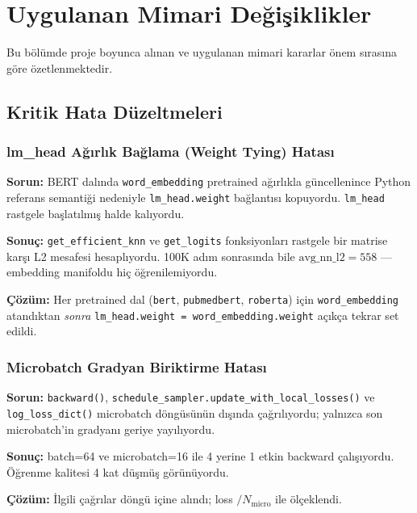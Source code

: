 \documentclass[12pt,a4paper]{article}
\begin{document}
\section{Uygulanan Mimari Değişiklikler}

Bu bölümde proje boyunca alınan ve uygulanan mimari kararlar önem sırasına göre özetlenmektedir.

\subsection{Kritik Hata Düzeltmeleri}

\subsubsection{lm\_head Ağırlık Bağlama (Weight Tying) Hatası}

\textbf{Sorun:} BERT dalında \texttt{word\_embedding} pretrained ağırlıkla güncellenince Python referans semantiği nedeniyle \texttt{lm\_head.weight} bağlantısı kopuyordu. \texttt{lm\_head} rastgele başlatılmış halde kalıyordu.

\textbf{Sonuç:} \texttt{get\_efficient\_knn} ve \texttt{get\_logits} fonksiyonları rastgele bir matrise karşı L2 mesafesi hesaplıyordu. 100K adım sonrasında bile $\text{avg\_nn\_l2} = 558$ --- embedding manifoldu hiç öğrenilemiyordu.

\textbf{Çözüm:} Her pretrained dal (\texttt{bert}, \texttt{pubmedbert}, \texttt{roberta}) için \texttt{word\_embedding} atandıktan \textit{sonra} \texttt{lm\_head.weight = word\_embedding.weight} açıkça tekrar set edildi.

\subsubsection{Microbatch Gradyan Biriktirme Hatası}

\textbf{Sorun:} \texttt{backward()}, \texttt{schedule\_sampler.update\_with\_local\_losses()} ve \texttt{log\_loss\_dict()} microbatch döngüsünün dışında çağrılıyordu; yalnızca son microbatch'in gradyanı geriye yayılıyordu.

\textbf{Sonuç:} batch=64 ve microbatch=16 ile 4 yerine 1 etkin backward çalışıyordu. Öğrenme kalitesi 4 kat düşmüş görünüyordu.

\textbf{Çözüm:} İlgili çağrılar döngü içine alındı; loss $/ N_{\text{micro}}$ ile ölçeklendi.
\end{document}
